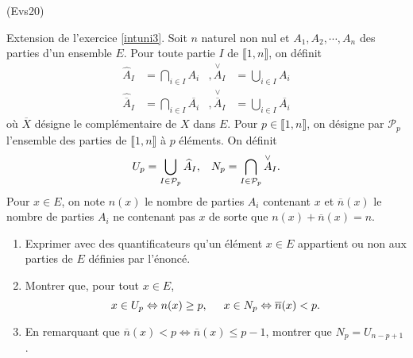 \begin{tiny}(Evs20)\end{tiny} \label{intunin} Extension de l'exercice \ref{intuni3}. Soit $n$ naturel non nul et $A_1,A_2, \cdots, A_n$ des parties d'un ensemble $E$. Pour toute partie $I$ de $\llbracket 1,n \rrbracket$, on définit
\[
\begin{aligned}
  \widehat{A}_I &= \bigcap_{i \in I} A_i &,   \overset{\vee}{A}_I &= \bigcup_{i \in I} A_i \\
  \widehat{\overline{A}}_I &= \bigcap_{i \in I} \overline{A_i} &,   \overset{\vee}{\overline{A}}_I &= \bigcup_{i \in I} \overline{A_i}
\end{aligned}  
\]
où $\overline{X}$ désigne le complémentaire de $X$ dans $E$.\newline
Pour $p\in \llbracket 1,n \rrbracket$, on désigne par $\mathcal{P}_p$ l'ensemble des parties de $\llbracket 1,n \rrbracket$ à $p$ éléments. On définit
\[
  U_p = \bigcup_{I \in \mathcal{P}_p}\widehat{A}_I, \hspace{0.3cm}
  N_p = \bigcap_{I \in \mathcal{P}_p}\overset{\vee}{A}_I.
\]
Pour $x\in E$, on note $n(x)$ le nombre de parties $A_i$ contenant $x$ et $\overline{n}(x)$ le nombre de parties $A_i$ ne contenant pas $x$ de sorte que
$n(x) + \overline{n}(x) = n$.
\begin{enumerate}
  \item Exprimer avec des quantificateurs qu'un élément $x\in E$ appartient ou non aux parties de $E$ définies par l'énoncé.
  \item Montrer que, pour tout $x\in E$, 
\[
x \in U_p \Leftrightarrow n(x) \geq p , \hspace{0.5cm}
x \in N_p \Leftrightarrow \overline{n}(x) < p  .
\]
  \item En remarquant que $\overline{n}(x) < p \Leftrightarrow \overline{n}(x) \leq  p - 1$, montrer que $N_p = U_{n-p+1}$.
\end{enumerate}

